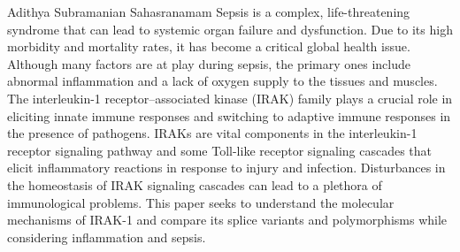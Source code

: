 \noindent

Adithya Subramanian Sahasranamam
Sepsis is a complex, life-threatening syndrome that can lead to systemic organ failure and dysfunction. Due to its high morbidity and mortality rates, it has become a critical global health issue. Although many factors are at play during sepsis, the primary ones include abnormal inflammation and a lack of oxygen supply to the tissues and muscles. The interleukin-1 receptor–associated kinase (IRAK) family plays a crucial role in eliciting innate immune responses and switching to adaptive immune responses in the presence of pathogens. IRAKs are vital components in the interleukin-1 receptor signaling pathway and some Toll-like receptor signaling cascades that elicit inflammatory reactions in response to injury and infection. Disturbances in the homeostasis of IRAK signaling cascades can lead to a plethora of immunological problems. This paper seeks to understand the molecular mechanisms of IRAK-1 and compare its splice variants and polymorphisms while considering inflammation and sepsis.
